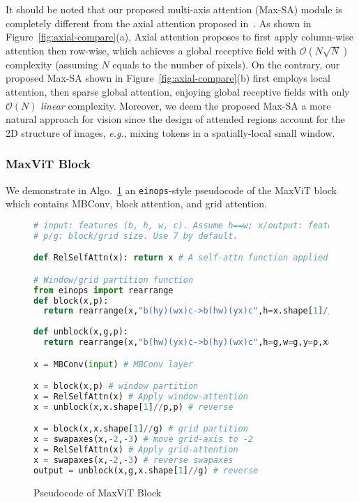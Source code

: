 \documentclass[runningheads]{llncs}
\def\eg{\emph{e.g.}, }
\begin{document}
It should be noted that our proposed multi-axis attention (Max-SA) module is completely different from the axial attention proposed in~\cite{ho2019axial,wang2020axial}. As shown in Figure~\ref{fig:axial-compare}(a), Axial attention proposes to first apply column-wise attention then row-wise, which achieves a global receptive field with $\mathcal{O}(N\sqrt{N})$ complexity (assuming $N$ equals to the number of pixels). On the contrary, our proposed Max-SA shown in Figure~\ref{fig:axial-compare}(b) first employs local attention, then sparse global attention, enjoying global receptive fields with only $\mathcal{O}(N)$ \textit{linear} complexity. Moreover, we deem the proposed Max-SA a more natural approach for vision since the design of attended regions account for the 2D structure of images, \eg mixing tokens in a spatially-local small window.




\subsubsection{MaxViT Block}
We demonstrate in Algo.~\ref{alg:code} an \texttt{einops}-style pseudocode of the MaxViT block which contains MBConv, block attention, and grid attention.

\begin{figure}[!ht]
\vspace{-10mm}
\begin{minipage}{1.\textwidth}
\begin{algorithm}[H]
\small
\caption{\small Pseudocode of MaxViT Block}
\label{alg:code}
\begin{lstlisting}[language=python]
# input: features (b, h, w, c). Assume h==w; x/output: features (b, h, w, c).
# p/g: block/grid size. Use 7 by default.

def RelSelfAttn(x): return x # A self-attn function applied on the -2 axis

# Window/grid partition function
from einops import rearrange
def block(x,p):
  return rearrange(x,"b(hy)(wx)c->b(hw)(yx)c",h=x.shape[1]//p,w=x.shape[2]//p,y=p,x=p)
    
def unblock(x,g,p):
  return rearrange(x,"b(hw)(yx)c->b(hy)(wx)c",h=g,w=g,y=p,x=p) 

x = MBConv(input) # MBConv layer

x = block(x,p) # window partition
x = RelSelfAttn(x) # Apply window-attention
x = unblock(x,x.shape[1]//p,p) # reverse

x = block(x,x.shape[1]//g) # grid partition
x = swapaxes(x,-2,-3) # move grid-axis to -2
x = RelSelfAttn(x) # Apply grid-attention
x = swapaxes(x,-2,-3) # reverse swapaxes
output = unblock(x,g,x.shape[1]//g) # reverse
\end{lstlisting}
\end{algorithm}
\end{minipage}
\vspace{-11mm}
\end{figure}
\end{document}
